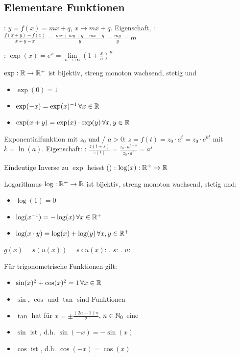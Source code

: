 \subsection{Elementare Funktionen}

\Def {}: $y = f(x) = mx + q$, $x \mapsto mx + q$. Eigenschaft, :
$\frac{f(x+y)-f(x)}{x+y-x} = \frac{mx + my + q -mx - q}{y} = \frac{my}{y} = m$

\Def {}: $\exp(x) = e^x = \lim\limits_{n\to\infty} \left(1 + \frac{x}{n}\right)^n$

\Satz $\exp: \mathbb{R} \to \mathbb{R}^+$ ist bijektiv, streng monoton wachsend, stetig und
\vspace{-0.6em}
\begin{itemize}
    \item $\exp(0) = 1$
    \item $\exp(-x) = \exp(x)^{-1} \, \forall x \in \mathbb{R}$
    \item $\exp(x + y) = \exp(x)\cdot\exp(y) \, \forall x,y \in \mathbb{R}$
\end{itemize}

\Def Exponentialfunktion mit  $z_0$ und / $a > 0$: $z = f(t) = z_0 \cdot a^t = z_0 \cdot e^{kt}$ mit $k = \ln(a)$.
Eigenschaft: : $\frac{z(t + s)}{z(t)} = \frac{z_0 \cdot a^{t + s}}{z_0 \cdot a^t} = a^s$

\Def Eindeutige Inverse zu $\exp$ heisst () : $\log(x): \mathbb{R}^+ \to \mathbb{R}$

\Satz Logarithmus $\log: \mathbb{R}^+ \to \mathbb{R}$ ist bijektiv, streng monoton wachsend, stetig und:
\vspace{-0.6em}
\begin{itemize}
    \item $\log(1) = 0$
    \item $\log(x^{-1}) = -\log(x) \, \forall x \in \mathbb{R}^+$
    \item $\log(x \cdot y) = \log(x) + \log(y) \, \forall x,y \in \mathbb{R}^+$
\end{itemize}

\Def $g(x) = s(u(x)) = s \circ u(x)$: . $s$: . $u$: 

\Satz Für trigonometrische Funktionen gilt:
\vspace{-0.6em}
\begin{itemize}
    \item $\sin(x)^2 + \cos(x)^2 = 1 \, \forall x \in \mathbb{R}$
    \item $\sin$, $\cos$ und $\tan$ sind  Funktionen
    \item $\tan$ hat für $x = \pm \frac{(2n+1)\pi}{2}$, $n \in \mathbb{N}_0$ eine 
    \item $\sin$ ist , d.h. $\sin(-x) = -\sin(x)$
    \item $\cos$ ist , d.h. $\cos(-x) = \cos(x)$
\end{itemize}

